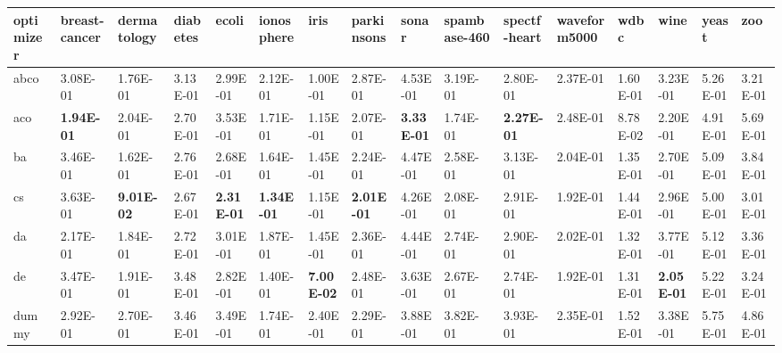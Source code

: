 \begin{table}
    \begin{adjustbox}{width=\linewidth}
        \begin{tabular}{llllllllllllllll}
            \toprule
            optimizer & breast-cancer     & dermatology       & diabetes          & ecoli             & ionosphere        & iris              & parkinsons        & sonar             & spambase-460      & spectf-heart      & waveform5000      & wdbc              & wine              & yeast             & zoo    \tabularnewline
            \midrule
            abco      & 3.08E-01          & 1.76E-01          & 3.13E-01          & 2.99E-01          & 2.12E-01          & 1.00E-01          & 2.87E-01          & 4.53E-01          & 3.19E-01          & 2.80E-01          & 2.37E-01          & 1.60E-01          & 3.23E-01          & 5.26E-01          & 3.21E-01\tabularnewline
            aco       & \textbf{1.94E-01} & 2.04E-01          & 2.70E-01          & 3.53E-01          & 1.71E-01          & 1.15E-01          & 2.07E-01          & \textbf{3.33E-01} & 1.74E-01          & \textbf{2.27E-01} & 2.48E-01          & 8.78E-02          & 2.20E-01          & 4.91E-01          & 5.69E-01\tabularnewline
            ba        & 3.46E-01          & 1.62E-01          & 2.76E-01          & 2.68E-01          & 1.64E-01          & 1.45E-01          & 2.24E-01          & 4.47E-01          & 2.58E-01          & 3.13E-01          & 2.04E-01          & 1.35E-01          & 2.70E-01          & 5.09E-01          & 3.84E-01\tabularnewline
            cs        & 3.63E-01          & \textbf{9.01E-02} & 2.67E-01          & \textbf{2.31E-01} & \textbf{1.34E-01} & 1.15E-01          & \textbf{2.01E-01} & 4.26E-01          & 2.08E-01          & 2.91E-01          & 1.92E-01          & 1.44E-01          & 2.96E-01          & 5.00E-01          & 3.01E-01\tabularnewline
            da        & 2.17E-01          & 1.84E-01          & 2.72E-01          & 3.01E-01          & 1.87E-01          & 1.45E-01          & 2.36E-01          & 4.44E-01          & 2.74E-01          & 2.90E-01          & 2.02E-01          & 1.32E-01          & 3.77E-01          & 5.12E-01          & 3.36E-01\tabularnewline
            de        & 3.47E-01          & 1.91E-01          & 3.48E-01          & 2.82E-01          & 1.40E-01          & \textbf{7.00E-02} & 2.48E-01          & 3.63E-01          & 2.67E-01          & 2.74E-01          & 1.92E-01          & 1.31E-01          & \textbf{2.05E-01} & 5.22E-01          & 3.24E-01\tabularnewline
            dummy     & 2.92E-01          & 2.70E-01          & 3.46E-01          & 3.49E-01          & 1.74E-01          & 2.40E-01          & 2.29E-01          & 3.88E-01          & 3.82E-01          & 3.93E-01          & 2.35E-01          & 1.52E-01          & 3.38E-01          & 5.75E-01          & 4.86E-01\tabularnewline

\end{tabular}
\end{adjustbox}
\end{table}
